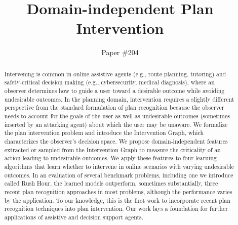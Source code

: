 \documentclass[letterpaper]{article}
\theoremstyle{plain}
\begin{document}
\title{Domain-independent Plan Intervention}
\author{ Paper \#204}
\newcommand{\debug}[2]{[\textbf{DEBUG #1}: \textcolor{WildStrawberry}{\textit{#2}}]}
\nocopyright
\maketitle
\begin{abstract}
Intervening is common in online assistive agents (e.g., route planning, tutoring) and safety-critical decision making (e.g., cybersecurity, medical diagnosis), where an observer determines how to guide a user toward a desirable outcome while avoiding undesirable outcomes.
In the planning domain, intervention requires a slightly different perspective from the standard formulation of plan recognition because the observer needs to account for the goals of the user as well as undesirable outcomes (sometimes inserted by an attacking agent) about which the user may be unaware.
We formalize the plan intervention problem and introduce the Intervention Graph, which characterizes the observer's decision space.
We propose domain-independent features extracted or sampled from the Intervention Graph to measure the criticality of an action leading to undesirable outcomes.
We apply these features to four learning algorithms that learn whether to intervene in online scenarios with varying undesirable outcomes.
In an evaluation of several benchmark problems, including one we introduce called Rush Hour,
the learned models outperform, sometimes substantially, three recent plan recognition approaches in most problems, although the performance varies by the application.
To our knowledge, this is the first work to incorporate recent plan recognition techniques into plan intervention.
Our work lays a foundation for further applications of assistive and decision support agents.
\end{abstract}
\end{document}
